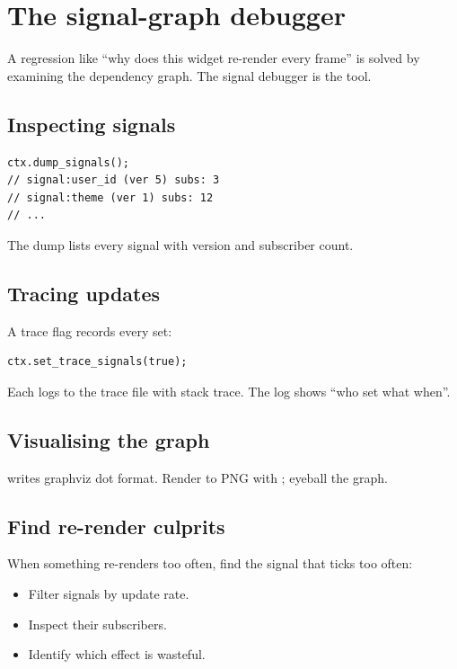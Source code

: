 \chapter{The signal-graph debugger}
\label{ch:signaldbg}

\begin{aside}
A regression like ``why does this widget re-render every
frame'' is solved by examining the dependency graph. The
signal debugger is the tool.
\end{aside}

\section{Inspecting signals}

\begin{lstlisting}
ctx.dump_signals();
// signal:user_id (ver 5) subs: 3
// signal:theme (ver 1) subs: 12
// ...
\end{lstlisting}

The dump lists every signal with version and subscriber
count.

\section{Tracing updates}

A trace flag records every set:

\begin{lstlisting}
ctx.set_trace_signals(true);
\end{lstlisting}

Each  logs to the trace file with stack trace.
The log shows ``who set what when''.

\section{Visualising the graph}

 writes graphviz dot format.
Render to PNG with ; eyeball the graph.

\section{Find re-render culprits}

When something re-renders too often, find the signal that
ticks too often:

\begin{itemize}[leftmargin=*]
  \item Filter signals by update rate.
  \item Inspect their subscribers.
  \item Identify which effect is wasteful.
\end{itemize}

